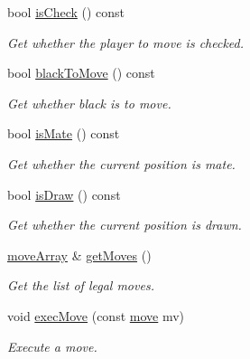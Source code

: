 \begin{DoxyCompactItemize}
bool \hyperlink{classBoard_a58ee677360099107d0d33becdc2af888}{is\+Check} () const
\begin{DoxyCompactList}\small\item\em Get whether the player to move is checked. \end{DoxyCompactList}\item 
\mbox{\label{classBoard_a78089ae51f1e8e02dfec7c739f3ca74a}} 
bool \hyperlink{classBoard_a78089ae51f1e8e02dfec7c739f3ca74a}{black\+To\+Move} () const
\begin{DoxyCompactList}\small\item\em Get whether black is to move. \end{DoxyCompactList}\item 
\mbox{\label{classBoard_adfdc9dd19eb4119b6926a70c89db7d31}} 
bool \hyperlink{classBoard_adfdc9dd19eb4119b6926a70c89db7d31}{is\+Mate} () const
\begin{DoxyCompactList}\small\item\em Get whether the current position is mate. \end{DoxyCompactList}\item 
\mbox{\label{classBoard_a6a9553957873a05f9cca67f8f0677b74}} 
bool \hyperlink{classBoard_a6a9553957873a05f9cca67f8f0677b74}{is\+Draw} () const
\begin{DoxyCompactList}\small\item\em Get whether the current position is drawn. \end{DoxyCompactList}\item 
\mbox{\label{classBoard_a993b2839790b3fbe4b1c6ba2a2257fe1}} 
\hyperlink{structmoveArray}{move\+Array} \& \hyperlink{classBoard_a993b2839790b3fbe4b1c6ba2a2257fe1}{get\+Moves} ()
\begin{DoxyCompactList}\small\item\em Get the list of legal moves. \end{DoxyCompactList}\item 
void \hyperlink{classBoard_a5732564ae8ce7f247072ded83f71dc75}{exec\+Move} (const \hyperlink{structmove}{move} mv)
\begin{DoxyCompactList}\small\item\em Execute a move. \end{DoxyCompactList}\item 
\mbox{\label{classBoard_ac33aaf879882d2c1abbab14c9727f2f9}} 

\end{DoxyCompactItemize}
